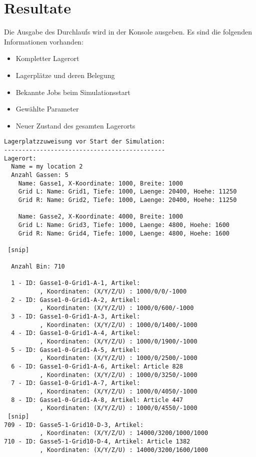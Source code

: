 \section{Resultate}
Die Ausgabe des Durchlaufs wird in der Konsole ausgeben. Es sind die folgenden Informationen vorhanden:
%
\begin{itemize}
  \item Kompletter Lagerort
  \item Lagerplätze und deren Belegung
  \item Bekannte Jobs beim Simulationsstart
  \item Gewählte Parameter
  \item Neuer Zustand des gesamten Lagerorts
\end{itemize}

\begin{verbatim}
Lagerplatzzuweisung vor Start der Simulation:
---------------------------------------------
Lagerort:
  Name = my location 2
  Anzahl Gassen: 5
    Name: Gasse1, X-Koordinate: 1000, Breite: 1000
    Grid L: Name: Grid1, Tiefe: 1000, Laenge: 20400, Hoehe: 11250
    Grid R: Name: Grid2, Tiefe: 1000, Laenge: 20400, Hoehe: 11250

    Name: Gasse2, X-Koordinate: 4000, Breite: 1000
    Grid L: Name: Grid3, Tiefe: 1000, Laenge: 4800, Hoehe: 1600
    Grid R: Name: Grid4, Tiefe: 1000, Laenge: 4800, Hoehe: 1600

 [snip]

  Anzahl Bin: 710

  1 - ID: Gasse1-0-Grid1-A-1, Artikel:            
          , Koordinaten: (X/Y/Z/U) : 1000/0/0/-1000
  2 - ID: Gasse1-0-Grid1-A-2, Artikel:            
          , Koordinaten: (X/Y/Z/U) : 1000/0/600/-1000
  3 - ID: Gasse1-0-Grid1-A-3, Artikel:            
          , Koordinaten: (X/Y/Z/U) : 1000/0/1400/-1000
  4 - ID: Gasse1-0-Grid1-A-4, Artikel:            
          , Koordinaten: (X/Y/Z/U) : 1000/0/1900/-1000
  5 - ID: Gasse1-0-Grid1-A-5, Artikel:            
          , Koordinaten: (X/Y/Z/U) : 1000/0/2500/-1000
  6 - ID: Gasse1-0-Grid1-A-6, Artikel: Article 828
          , Koordinaten: (X/Y/Z/U) : 1000/0/3250/-1000
  7 - ID: Gasse1-0-Grid1-A-7, Artikel:            
          , Koordinaten: (X/Y/Z/U) : 1000/0/4050/-1000
  8 - ID: Gasse1-0-Grid1-A-8, Artikel: Article 447
          , Koordinaten: (X/Y/Z/U) : 1000/0/4550/-1000
 [snip]
709 - ID: Gasse5-1-Grid10-D-3, Artikel:           
          , Koordinaten: (X/Y/Z/U) : 14000/3200/1000/1000
710 - ID: Gasse5-1-Grid10-D-4, Artikel: Article 1382
          , Koordinaten: (X/Y/Z/U) : 14000/3200/1600/1000


\end{verbatim}
